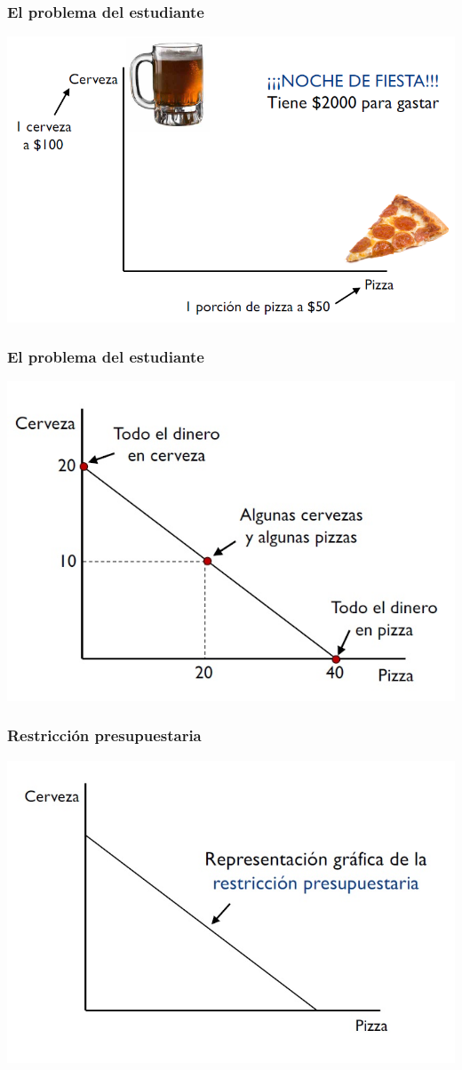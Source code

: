 \documentclass{beamer}
\begin{document}
\begin{frame}
\frametitle{ El problema del estudiante}
\centering
\includegraphics[scale=0.5]{Figures/Tema_02.2_rp.png}
\end{frame}

\begin{frame}
\frametitle{ El problema del estudiante}
\centering
\includegraphics[scale=0.6]{Figures/Tema_02.3_rp1.jpg}
\end{frame}

\begin{frame}
\frametitle{Restricción presupuestaria}
\centering
\includegraphics[scale=0.6]{Figures/Tema_02.4_rp2.jpg}
\end{frame}
\end{document}
